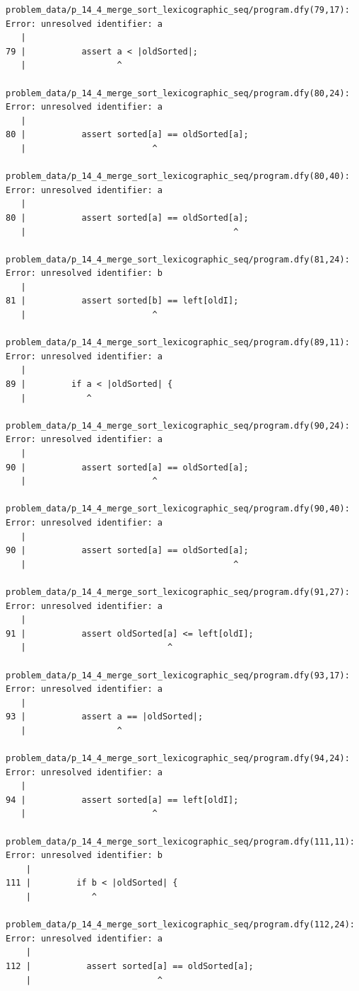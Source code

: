 \documentclass{article}
\begin{document}
\begin{lstlisting}
problem_data/p_14_4_merge_sort_lexicographic_seq/program.dfy(79,17): Error: unresolved identifier: a
   |
79 |           assert a < |oldSorted|;
   |                  ^

problem_data/p_14_4_merge_sort_lexicographic_seq/program.dfy(80,24): Error: unresolved identifier: a
   |
80 |           assert sorted[a] == oldSorted[a];
   |                         ^

problem_data/p_14_4_merge_sort_lexicographic_seq/program.dfy(80,40): Error: unresolved identifier: a
   |
80 |           assert sorted[a] == oldSorted[a];
   |                                         ^

problem_data/p_14_4_merge_sort_lexicographic_seq/program.dfy(81,24): Error: unresolved identifier: b
   |
81 |           assert sorted[b] == left[oldI];
   |                         ^

problem_data/p_14_4_merge_sort_lexicographic_seq/program.dfy(89,11): Error: unresolved identifier: a
   |
89 |         if a < |oldSorted| {
   |            ^

problem_data/p_14_4_merge_sort_lexicographic_seq/program.dfy(90,24): Error: unresolved identifier: a
   |
90 |           assert sorted[a] == oldSorted[a];
   |                         ^

problem_data/p_14_4_merge_sort_lexicographic_seq/program.dfy(90,40): Error: unresolved identifier: a
   |
90 |           assert sorted[a] == oldSorted[a];
   |                                         ^

problem_data/p_14_4_merge_sort_lexicographic_seq/program.dfy(91,27): Error: unresolved identifier: a
   |
91 |           assert oldSorted[a] <= left[oldI];
   |                            ^

problem_data/p_14_4_merge_sort_lexicographic_seq/program.dfy(93,17): Error: unresolved identifier: a
   |
93 |           assert a == |oldSorted|;
   |                  ^

problem_data/p_14_4_merge_sort_lexicographic_seq/program.dfy(94,24): Error: unresolved identifier: a
   |
94 |           assert sorted[a] == left[oldI];
   |                         ^

problem_data/p_14_4_merge_sort_lexicographic_seq/program.dfy(111,11): Error: unresolved identifier: b
    |
111 |         if b < |oldSorted| {
    |            ^

problem_data/p_14_4_merge_sort_lexicographic_seq/program.dfy(112,24): Error: unresolved identifier: a
    |
112 |           assert sorted[a] == oldSorted[a];
    |                         ^


\end{lstlisting}
\end{document}
